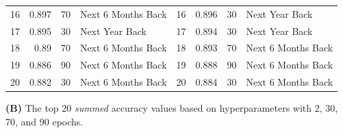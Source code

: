 \documentclass[utf8]{FrontiersinVancouver} %
\begin{document}
\begin{table}[htb]
\begin{center}
{\begin{tabular}{|r|r|r|l| |r|r|r|l|}
16  &  0.897 &     70 &  Next 6 Months Back &  16 & 0.896 &     30 &      Next Year Back \\
17  &  0.895 &     30 &      Next Year Back &  17 & 0.894 &     30 &      Next Year Back \\
18  &  0.89 &     70 &  Next 6 Months Back &  18 & 0.893 &     70 &  Next 6 Months Back \\
19  &  0.886 &     90 &  Next 6 Months Back &  19 & 0.888 &     90 &  Next 6 Months Back \\
20  &  0.882 &     30 &  Next 6 Months Back &  20 & 0.884 &     30 &  Next 6 Months Back \\

        \hline
        \end{tabular}
        }
        \end{center}
        
        {\bf (B)} The top 20 {\em summed} accuracy values based on hyperparameters with 2, 30, 70, and 90 epochs.


\end{table}
\end{document}
